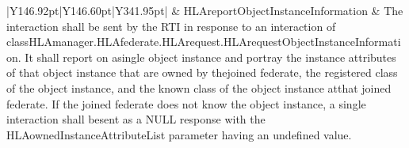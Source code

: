 \begin{landscape}
\begin{momtabletypeset}[8.00]
{{\begin{tabular}{|Y{146.92pt}|Y{146.60pt}|Y{341.95pt}|}
                    & HLAreportObjectInstanceInformation & The interaction shall be sent by the RTI in response to an interaction of class\allowbreak{}HLAmanager.\allowbreak{}HLAfederate.\allowbreak{}HLArequest.\allowbreak{}HLArequestObjectInstanceInformation.\allowbreak{} It shall report on a\allowbreak{}single object instance and portray the instance attributes of that object instance that are owned by the\allowbreak{}joined federate, the registered class of the object instance, and the known class of the object instance at\allowbreak{}that joined federate.\allowbreak{} If the joined federate does not know the object instance, a single interaction shall be\allowbreak{}sent as a NULL response with the HLAownedInstanceAttributeList parameter having an undefined value.\allowbreak{}                                                                                               \\
                    \hline
                \end{tabular}%
            }%
        }%
    \end{momtabletypeset}
    \newpage


\end{landscape}
